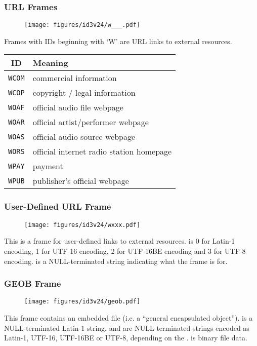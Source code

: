\clearpage

\subsubsection{URL Frames}
\begin{figure}[h]
\texttt{[image: figures/id3v24/w\_\_\_.pdf]}
\end{figure}
\par
\noindent
Frames with IDs beginning with `W' are URL links to external resources.
\par
\begin{table}[h]
\begin{tabular}{|c|l|}
\hline
ID & Meaning \\
\hline
\texttt{WCOM} & commercial information \\
\texttt{WCOP} & copyright / legal information \\
\texttt{WOAF} & official audio file webpage \\
\texttt{WOAR} & official artist/performer webpage \\
\texttt{WOAS} & official audio source webpage \\
\texttt{WORS} & official internet radio station homepage \\
\texttt{WPAY} & payment \\
\texttt{WPUB} & publisher's official webpage \\
\hline
\end{tabular}
\end{table}

\clearpage

\subsubsection{User-Defined URL Frame}

\begin{figure}[h]
\texttt{[image: figures/id3v24/wxxx.pdf]}
\end{figure}
\par
\noindent
This is a frame for user-defined links to external resources.
 is 0 for Latin-1 encoding, 1 for UTF-16 encoding,
2 for UTF-16BE encoding and 3 for UTF-8 encoding.
 is a NULL-terminated string indicating
what the frame is for.

\clearpage

\subsubsection{GEOB Frame}
\begin{figure}[h]
  \texttt{[image: figures/id3v24/geob.pdf]}
\end{figure}
\par
\noindent
This frame contains an embedded file (i.e. a ``general encapsulated object'').
 is a NULL-terminated Latin-1 string.
 and  are NULL-terminated
strings encoded as Latin-1, UTF-16, UTF-16BE or UTF-8,
depending on the .
 is binary file data.

